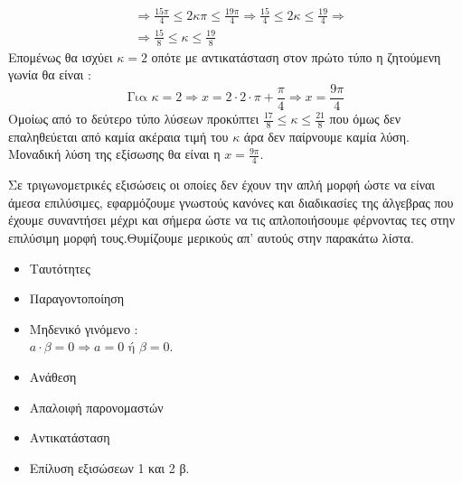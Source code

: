 \begin{rlist}
\begin{align*}
&\Rightarrow \frac{15\pi}{4}\leq 2\kappa\pi\leq\frac{19\pi}{4}\Rightarrow \frac{15}{4}\leq 2\kappa\leq\frac{19}{4}\Rightarrow\\
&\Rightarrow \frac{15}{8}\leq\kappa\leq\frac{19}{8}
\end{align*}
Επομένως θα ισχύει $ \kappa=2 $ οπότε με αντικατάσταση στον πρώτο τύπο η ζητούμενη γωνία θα είναι :
\[ \textrm{Για }\kappa=2\Rightarrow x=2\cdot 2\cdot\pi+\frac{\pi}{4}\Rightarrow x=\frac{9\pi}{4}\]
Ομοίως από το δεύτερο τύπο λύσεων προκύπτει $ \frac{17}{8}\leq\kappa\leq\frac{21}{8} $ που όμως δεν επαληθεύεται από καμία ακέραια τιμή του $ \kappa $ άρα δεν παίρνουμε καμία λύση. Μοναδική λύση της εξίσωσης θα είναι η $ x=\frac{9\pi}{4} $.
\end{rlist}
\begin{Methodos}{2cm}
Σε τριγωνομετρικές εξισώσεις οι οποίες δεν έχουν την απλή μορφή ώστε να είναι άμεσα επιλύσιμες, εφαρμόζουμε γνωστούς κανόνες και διαδικασίες της άλγεβρας που έχουμε συναντήσει μέχρι και σήμερα ώστε να τις απλοποιήσουμε φέρνοντας τες στην επιλύσιμη μορφή τους.Θυμίζουμε μερικούς απ' αυτούς στην παρακάτω λίστα.
\begin{multicols}{2}
\begin{itemize}[itemsep=0mm]
\item Ταυτότητες
\item Παραγοντοποίηση
\item Μηδενικό γινόμενο : \\$ a\cdot\beta=0\Rightarrow a=0\textrm{ ή }\beta=0 $.
\item Ανάθεση
\item Απαλοιφή παρονομαστών
\item Αντικατάσταση
\item Επίλυση εξισώσεων 1 και 2 β.
\end{itemize}
\end{multicols}
\end{Methodos}
